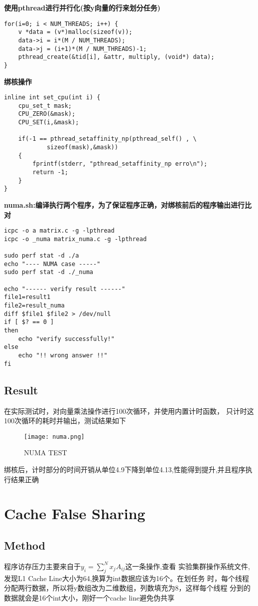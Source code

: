 \documentclass{article}
\begin{document}
\textbf{
使用pthread进行并行化(按y向量的行来划分任务)
}
\begin{lstlisting}
for(i=0; i < NUM_THREADS; i++) {
    v *data = (v*)malloc(sizeof(v));
    data->i = i*(M / NUM_THREADS);
    data->j = (i+1)*(M / NUM_THREADS)-1;
    pthread_create(&tid[i], &attr, multiply, (void*) data);
}
\end{lstlisting}

\textbf{绑核操作}
\begin{lstlisting}
inline int set_cpu(int i) {
    cpu_set_t mask;  
    CPU_ZERO(&mask);  
    CPU_SET(i,&mask);  

    if(-1 == pthread_setaffinity_np(pthread_self() , \
            sizeof(mask),&mask))  
    {  
        fprintf(stderr, "pthread_setaffinity_np erro\n");  
        return -1;  
    }  
}
\end{lstlisting}

\textbf{
numa.sh:编译执行两个程序，为了保证程序正确，对绑核前后的程序输出进行比对
}

\begin{lstlisting}
icpc -o a matrix.c -g -lpthread
icpc -o _numa matrix_numa.c -g -lpthread

sudo perf stat -d ./a
echo "---- NUMA case -----"
sudo perf stat -d ./_numa

echo "------ verify result ------"
file1=result1
file2=result_numa
diff $file1 $file2 > /dev/null
if [ $? == 0 ]
then
    echo "verify successfully!"
else
    echo "!! wrong answer !!"
fi
\end{lstlisting}

\subsection{Result}
在实际测试时，对向量乘法操作进行100次循环，并使用内置计时函数，
只计时这100次循环的耗时并输出，测试结果如下
\begin{figure}[htpb]
    \centering
    \texttt{[image: numa.png]}    
    \caption{NUMA TEST}
\end{figure}
绑核后，计时部分的时间开销从单位4.9下降到单位4.13,性能得到提升,并且程序执行结果正确

\section{Cache False Sharing}
\subsection{Method}
程序访存压力主要来自于$y_i = \sum_{j}^{N}x_jA_{ij}$这一条操作,查看
实验集群操作系统文件,发现L1 Cache Line大小为64,换算为int数据应该为16个。在划任务
时，每个线程分配两行数据，所以将y数组改为二维数组，列数填充为8，这样每个线程
分到的数据就会是16个int大小，刚好一个cache line避免伪共享
\end{document}

